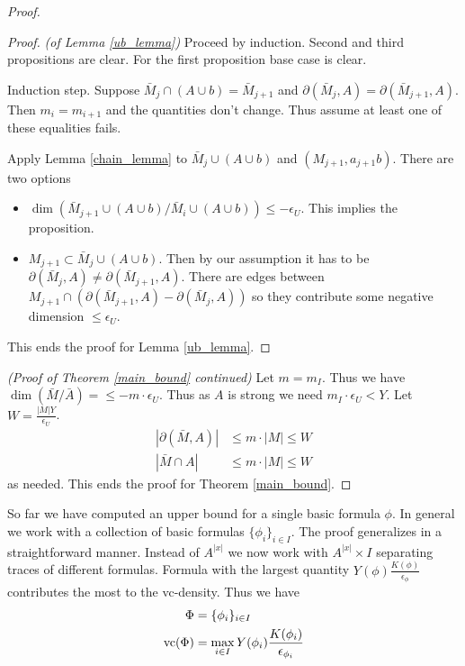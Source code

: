 \documentclass{amsart}
\begin{document}
\begin{proof}
	\begin{proof} \textit{(of Lemma \ref{ub_lemma})}
		Proceed by induction.
		Second and third propositions are clear.
		For the first proposition base case is clear.
		
		Induction step.
		Suppose $\bar M_j \cap (A \cup b) = \bar M_{j+1}$ and $\partial(\bar M_j, A) = \partial(\bar M_{j+1}, A)$.
		Then $m_i = m_{i+1}$ and the quantities don't change.
		Thus assume at least one of these equalities fails.
		
		Apply Lemma \ref{chain_lemma} to $\bar M_j \cup (A \cup b)$ and $(M_{j+1}, a_{j+1}b)$.
		There are two options
		
		\begin{itemize}
			\item $\dim(\bar M_{j+1} \cup (A \cup b) / \bar M_i \cup (A \cup b)) \leq -\epsilon_U$.
			This implies the proposition.
			\item $M_{j+1} \subset \bar M_j \cup (A \cup b)$.
			Then by our assumption it has to be $\partial(\bar M_j, A) \neq \partial(\bar M_{j+1}, A)$.
			There are edges between $M_{j+1} \cap (\partial(\bar M_{j+1}, A) - \partial(\bar M_j, A))$ so they contribute some negative dimension $\leq \epsilon_U$.
		\end{itemize}
		This ends the proof for Lemma \ref{ub_lemma}.
	\end{proof}
	\textit{(Proof of Theorem \ref{main_bound} continued)}
	Let $m = m_I$.
	Thus we have $\dim(\bar M / \bar A) = \leq -m \cdot \epsilon_U $.
	Thus as $A$ is strong we need $m_I \cdot \epsilon_U < Y$.
	Let $W = \frac{|M|Y}{\epsilon_U}$.
	\begin{align*}
		|\partial(\bar M, A)| &\leq m \cdot |M| \leq W \\
		|\bar M \cap A| &\leq m \cdot |M| \leq W
	\end{align*}
	as needed.
	This ends the proof for Theorem \ref{main_bound}.
\end{proof}

So far we have computed an upper bound for a single basic formula $\phi$.
In general we work with a collection of basic formulas $\{\phi_i\}_{i \in I}$.
The proof generalizes in a straightforward manner.
Instead of $A^{|x|}$ we now work with $A^{|x|} \times I$ separating traces of different formulas.
Formula with the largest quantity $Y(\phi)\frac{K(\phi)}{\epsilon_\phi}$ contributes the most to the vc-density.
Thus we have
\begin{align*}
	\Phi &= \{\phi_i\}_{i \in I} \\
	\operatorname{vc}(\Phi) &=  \max_{i \in I} Y(\phi_i) \frac{K(\phi_i)}{\epsilon_{\phi_i}}
\end{align*}
\end{document}

